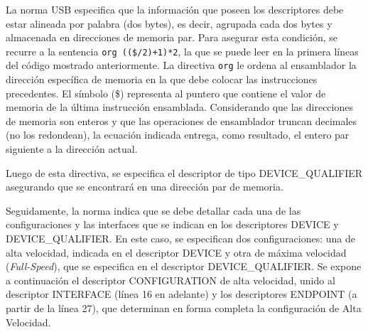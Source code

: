 	La norma USB especifica que la información que poseen los descriptores debe estar alineada por palabra (dos bytes), es decir, agrupada cada dos bytes y almacenada en direcciones de memoria par. Para asegurar esta condición, se recurre a la sentencia \verb|org (($/2)+1)*2|, la que se puede leer en la primera líneas del código mostrado anteriormente. La directiva \verb|org| le ordena al ensamblador la dirección específica de memoria en la que debe colocar las instrucciones precedentes. El símbolo (\$) representa al puntero que contiene el valor de memoria de la última instrucción ensamblada. Considerando que las direcciones de memoria son enteros y que las operaciones de ensamblador truncan decimales (no los redondean), la ecuación indicada entrega, como resultado, el entero par siguiente a la dirección actual. 

	Luego de esta directiva, se especifica el descriptor de tipo DEVICE\_QUALIFIER asegurando que se encontrará en una dirección par de memoria.
	
	Seguidamente, la norma indica que se debe detallar cada una de las configuraciones y las interfaces que se indican en los descriptores DEVICE y DEVICE\_QUALIFIER. En este caso, se especifican dos configuraciones: una de alta velocidad, indicada en el descriptor DEVICE y otra de máxima velocidad ({\it Full-Speed}), que se especifica en el descriptor DEVICE\_QUALIFIER. Se expone a continuación el descriptor CONFIGURATION de alta velocidad, unido al descriptor INTERFACE (línea 16 en adelante) y los descriptores ENDPOINT (a partir de la línea 27), que determinan en forma completa la configuración de Alta Velocidad.
	

